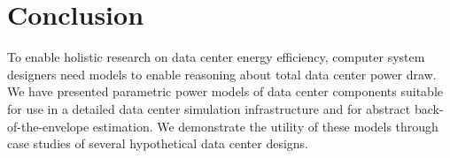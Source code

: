 \section{Conclusion}
To enable holistic research on data center energy efficiency, computer system designers need models to enable reasoning about total data center power draw.  We have presented parametric power models of data center components suitable for use in a detailed data center simulation infrastructure and for abstract back-of-the-envelope estimation.  We demonstrate the utility of these models through case studies of several hypothetical data center designs.
